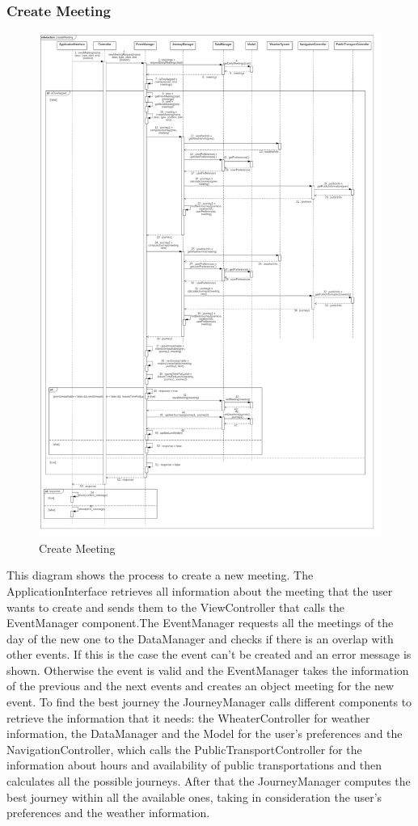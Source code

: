 \subsubsection{Create Meeting}
\begin{figure}[H]
\centering
\includegraphics[scale=0.25]{images/CreateMeeting}
\caption{Create Meeting}
\end{figure}This diagram shows the process to create a new meeting. The ApplicationInterface retrieves all information about the meeting that the user wants to create and sends them to the ViewController that calls the EventManager component.The EventManager requests all the meetings of the day of the new one to the DataManager and checks if there is an overlap with other events. If this is the case the event can’t be created and an error message is shown. Otherwise the event is valid and the EventManager takes the information of the previous and the next events and creates an object meeting for the new event. To find the best journey the JourneyManager calls different components to retrieve the information that it needs: the WheaterController for weather information, the DataManager and the Model for the user’s preferences and the NavigationController, which calls the PublicTransportController for the information about hours and availability of public transportations and then calculates all the possible journeys. After that the JourneyManager computes the best journey within all the available ones, taking in consideration the user’s preferences and the weather information.
